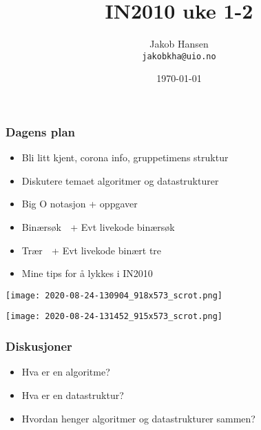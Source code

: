 \documentclass[norsk]{beamer}
\title{IN2010 uke 1-2}
\author{Jakob Hansen \\ \texttt{jakobkha@uio.no}}
\date{\today}
\begin{document}
	\frame{\titlepage}
    \begin{frame}
        \frametitle{Dagens plan}
        \center
        \begin{itemize}
            \item Bli litt kjent, corona info, gruppetimens struktur
            \item Diskutere temaet algoritmer og datastrukturer
                \item Big O notasjon + oppgaver
            \item Binærsøk {\Emoji 🔎} + Evt livekode binærsøk
            \item Trær {\Emoji 🌲} + Evt livekode binært tre
            \item Mine tips for å lykkes i IN2010
        \end{itemize}
    \end{frame}

    \begin{frame}
        \begin{center}
            \texttt{[image: 2020-08-24-130904\_918x573\_scrot.png]}
        \end{center}
    \end{frame}

    \begin{frame}
        \begin{center}
            \texttt{[image: 2020-08-24-131452\_915x573\_scrot.png]}
        \end{center}
    \end{frame}

    \begin{frame}
        \frametitle{Diskusjoner}
        \begin{itemize}
            \item Hva er en algoritme?
            \pause
            \item Hva er en datastruktur?
            \pause
        \item Hvordan henger algoritmer og datastrukturer sammen? {\Emoji 🤝}
        \end{itemize}
    \end{frame}
\end{document}

